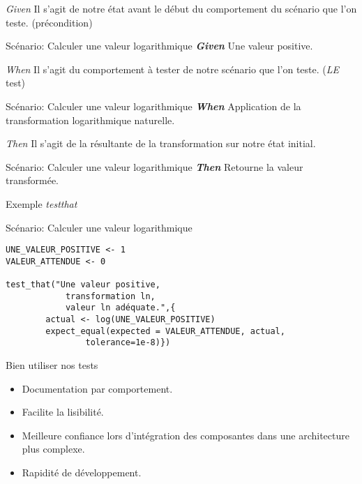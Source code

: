 \documentclass[11pt]{beamer}
\begin{document}
\begin{frame}{\textit{Given}}
Il s'agit de notre état avant le début du comportement du scénario que l'on teste. (précondition)

\begin{block}{Scénario: Calculer une valeur logarithmique}
\textit{\textbf{Given}} Une valeur positive.
\end{block}
\end{frame}

\begin{frame}{\textit{When}}
Il s'agit du comportement à tester de notre scénario que l'on teste. (\emph{LE} test)

\begin{block}{Scénario: Calculer une valeur logarithmique}
\textit{\textbf{When}} Application de la transformation logarithmique naturelle.
\end{block}
\end{frame}

\begin{frame}{\textit{Then}}
Il s'agit de la résultante de la transformation sur notre état initial.
\begin{block}{Scénario: Calculer une valeur logarithmique}
\textit{\textbf{Then}} Retourne la valeur transformée.
\end{block}
\end{frame}

\begin{frame}[fragile]{Exemple \textit{testthat}}
\begin{block}{Scénario: Calculer une valeur logarithmique}
\begin{lstlisting}
UNE_VALEUR_POSITIVE <- 1
VALEUR_ATTENDUE <- 0
	
test_that("Une valeur positive,
			transformation ln,
			valeur ln adéquate.",{
		actual <- log(UNE_VALEUR_POSITIVE)
		expect_equal(expected = VALEUR_ATTENDUE, actual, 
				tolerance=1e-8)})
\end{lstlisting}
\end{block}
\end{frame}

\begin{frame}{Bien utiliser nos tests}
\begin{itemize}
\item Documentation par comportement.
\item Facilite la lisibilité.
\item Meilleure confiance lors d'intégration des composantes dans une architecture plus complexe.
\item Rapidité de développement.
\end{itemize}
\end{frame}
\end{document}
